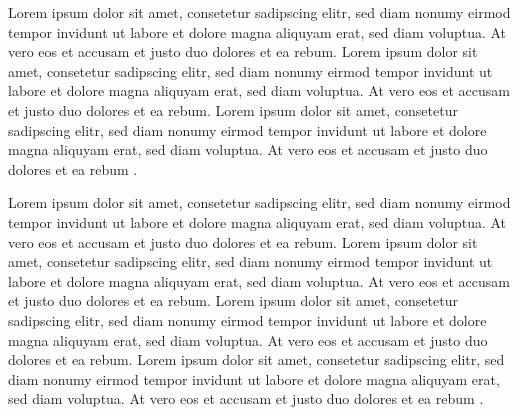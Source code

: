 Lorem ipsum dolor sit amet, consetetur sadipscing elitr, sed diam nonumy eirmod tempor invidunt ut labore et dolore magna aliquyam erat, sed diam voluptua. At vero eos et accusam et justo duo dolores et ea rebum. Lorem ipsum dolor sit amet, consetetur sadipscing elitr, sed diam nonumy eirmod tempor invidunt ut labore et dolore magna aliquyam erat, sed diam voluptua. At vero eos et accusam et justo duo dolores et ea rebum. Lorem ipsum dolor sit amet, consetetur sadipscing elitr, sed diam nonumy eirmod tempor invidunt ut labore et dolore magna aliquyam erat, sed diam voluptua. At vero eos et accusam et justo duo dolores et ea rebum \cite{Deci_Ryan_1990}. 

Lorem ipsum dolor sit amet, consetetur sadipscing elitr, sed diam nonumy eirmod tempor invidunt ut labore et dolore magna aliquyam erat, sed diam voluptua. At vero eos et accusam et justo duo dolores et ea rebum. Lorem ipsum dolor sit amet, consetetur sadipscing elitr, sed diam nonumy eirmod tempor invidunt ut labore et dolore magna aliquyam erat, sed diam voluptua. At vero eos et accusam et justo duo dolores et ea rebum. Lorem ipsum dolor sit amet, consetetur sadipscing elitr, sed diam nonumy eirmod tempor invidunt ut labore et dolore magna aliquyam erat, sed diam voluptua. At vero eos et accusam et justo duo dolores et ea rebum. Lorem ipsum dolor sit amet, consetetur sadipscing elitr, sed diam nonumy eirmod tempor invidunt ut labore et dolore magna aliquyam erat, sed diam voluptua. At vero eos et accusam et justo duo dolores et ea rebum \cite{lepichon}.

\newenvironment{changemargin}[4]{
	\begin{list}{}{
			\setlength{\voffset}{#1}
			\setlength{\oddsidemargin}{#2}
			\setlength{\evensidemargin}{#3}
			\setlength{\textheight}{#3}
		}
		\item[] ~ \par
	}{
	\end{list}
}

